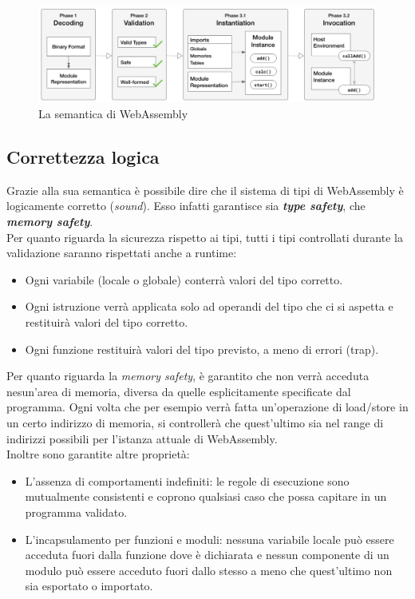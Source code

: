 \begin{figure}
        \begin{center}
                \includegraphics[width=0.97\columnwidth]{images/wasmSemanticPhases.png}
        \end{center}
        \caption{La semantica di WebAssembly}
        \label{fig:wasmPhases}
\end{figure}

\newpage
\subsection{Correttezza logica}
Grazie alla sua semantica è possibile dire che il sistema di tipi di WebAssembly è logicamente corretto (\emph{sound})\cite*{wasm:soundness}. Esso infatti garantisce sia \emph{\textbf{type safety}}, che \emph{\textbf{memory safety}}.
\\Per quanto riguarda la sicurezza rispetto ai tipi, tutti i tipi controllati durante la validazione saranno rispettati anche a runtime:
\begin{itemize}
        \item Ogni variabile (locale o globale) conterrà valori del tipo corretto.
        \item Ogni istruzione verrà applicata solo ad operandi del tipo che ci si aspetta e restituirà valori del tipo corretto.
        \item Ogni funzione restituirà valori del tipo previsto, a meno di errori (trap).
\end{itemize}
Per quanto riguarda la \emph{memory safety}, è garantito che non verrà acceduta nesun'area di memoria, diversa da quelle esplicitamente specificate dal programma. Ogni volta che per esempio verrà fatta un'operazione di load/store in un certo indirizzo di memoria, si controllerà che quest'ultimo sia nel range di indirizzi possibili per l'istanza attuale di WebAssembly.
\\Inoltre sono garantite altre proprietà: 
\begin{itemize}
        \item L'assenza di comportamenti indefiniti: le regole di esecuzione sono mutualmente consistenti e coprono qualsiasi caso che possa capitare in un programma validato.
        \item L'incapsulamento per funzioni e moduli: nessuna variabile locale può essere acceduta fuori dalla funzione dove è dichiarata e nessun componente di un modulo può essere acceduto fuori dallo stesso a meno che quest'ultimo non sia esportato o importato.
\end{itemize}
